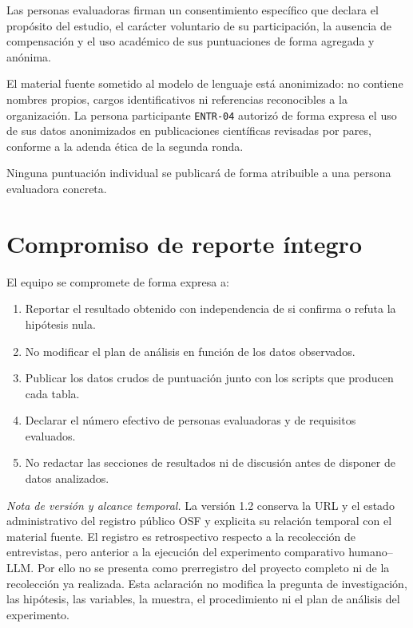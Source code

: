 \documentclass[11pt,a4paper]{article}
\newcommand{\id}[1]{\texttt{#1}}
\begin{document}
Las personas evaluadoras firman un consentimiento específico que declara el propósito del estudio,
el carácter voluntario de su participación, la ausencia de compensación y el uso académico de sus
puntuaciones de forma agregada y anónima.

El material fuente sometido al modelo de lenguaje está anonimizado: no contiene nombres propios,
cargos identificativos ni referencias reconocibles a la organización. La persona participante
\id{ENTR-04} autorizó de forma expresa el uso de sus datos anonimizados en publicaciones
científicas revisadas por pares, conforme a la adenda ética de la segunda ronda.

Ninguna puntuación individual se publicará de forma atribuible a una persona evaluadora concreta.

\section{Compromiso de reporte íntegro}

El equipo se compromete de forma expresa a:

\begin{enumerate}[nosep,leftmargin=1.8em]
  \item Reportar el resultado obtenido con independencia de si confirma o refuta la hipótesis nula.
  \item No modificar el plan de análisis en función de los datos observados.
  \item Publicar los datos crudos de puntuación junto con los scripts que producen cada tabla.
  \item Declarar el número efectivo de personas evaluadoras y de requisitos evaluados.
  \item No redactar las secciones de resultados ni de discusión antes de disponer de datos
        analizados.
\end{enumerate}

\noindent
{}


\medskip
\noindent\textit{Nota de versión y alcance temporal.} La versión 1.2 conserva la URL y
el estado administrativo del registro público OSF y explicita su relación temporal con
el material fuente. El registro es retrospectivo respecto a la recolección de entrevistas,
pero anterior a la ejecución del experimento comparativo humano--LLM. Por ello no se presenta
como prerregistro del proyecto completo ni de la recolección ya realizada. Esta aclaración no
modifica la pregunta de investigación, las hipótesis, las variables, la muestra, el procedimiento
ni el plan de análisis del experimento.
\end{document}
